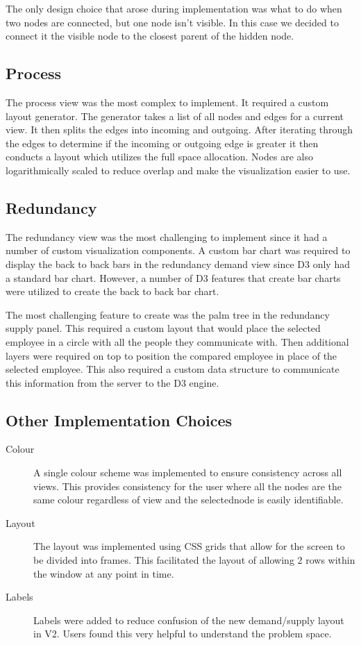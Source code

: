 \documentclass[journal]{vgtc}                %
\begin{document}
The only design choice that arose during implementation was what to do when two nodes are connected, but one node isn't visible.  In this case we decided to connect it the visible node to the closest parent of the hidden node.

\subsection{Process}
The process view was the most complex to implement.  It required a custom layout generator.  The generator takes a list of all nodes and edges for a current view.  It then splits the edges into incoming and outgoing.  After iterating through the edges to determine if the incoming or outgoing edge is greater it then conducts a layout which utilizes the full space allocation.  Nodes are also logarithmically scaled to reduce overlap and make the visualization easier to use.

\subsection{Redundancy}
The redundancy view was the most challenging to implement since it had a number of custom visualization components.  A custom bar chart was required to display the back to back bars in the redundancy demand view since D3 only had a standard bar chart.  However, a number of D3 features that create bar charts were utilized to create the back to back bar chart.

The most challenging feature to create was the palm tree in the redundancy supply panel.  This required a custom layout that would place the selected employee in a circle with all the people they communicate with.  Then additional layers were required on top to position the compared employee in place of the selected employee.  This also required a custom data structure to communicate this information from the server to the D3 engine.

\subsection{Other Implementation Choices}

\begin{description}
\item [Colour] A single colour scheme was implemented to ensure consistency across all views.  This provides consistency for the user where all the nodes are the same colour regardless of view and the selectednode is easily identifiable.
\item[Layout] The layout was implemented using CSS grids that allow for the screen to be divided into frames.  This facilitated the layout of allowing 2 rows within the window at any point in time.
\item[Labels] Labels were added to reduce confusion of the new demand/supply layout in V2.  Users found this very helpful to understand the problem space.
\end{description}
\end{document}
